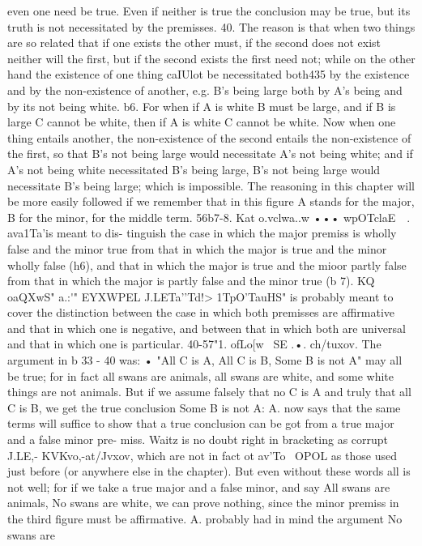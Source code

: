 {even one need be true. Even if neither is true the conclusion may
be true, but its truth is not necessitated by the premisses.
40. The reason is that when two things are so related that if
one exists the other must, if the second does not exist neither will
the first, but if the second exists the first need not; while on the
other hand the existence of one thing caIUlot be necessitated both435
by the existence and by the non-existence of another, e.g. B's
being large both by A's being and by its not being white.
b6. For when if A is white B must be large, and if B is large C
cannot be white, then if A is white C cannot be white. Now when
one thing entails another, the non-existence of the second entails
the non-existence of the first, so that B's not being large would
necessitate A's not being white; and if A's not being white
necessitated B's being large, B's not being large would necessitate
B's being large; which is impossible.
The reasoning in this chapter will be more easily followed if we
remember that in this figure A stands for the major, B for the
minor, for the middle term.
56b7-8. Kat o.vclwa}..w ••• wpOTclaE~~. ava1Ta'\Lv is meant to dis-
tinguish the case in which the major premiss is wholly false and
the minor true from that in which the major is true and the minor
wholly false (h6), and that in which the major is true and the
mioor partly false from that in which the major is partly false and
the minor true (b 7). KQ~ oaQXwS" a.:\'\wS" EYXWPEL J.LETa'\afkiv 'Td!>
1TpO'TauHS" is probably meant to cover the distinction between the
case in which both premisses are affirmative and that in which one
is negative, and between that in which both are universal and that
in which one is particular.
40-57"1. ofLo[w~ SE .•. ch/tuxov. The argument in b 33 - 40 was:
• "All C is A, All C is B, Some B is not A" may all be true; for in
fact all swans are animals, all swans are white, and some white
things are not animals. But if we assume falsely that no C is A and
truly that all C is B, we get the true conclusion Some B is not A:
A. now says that the same terms will suffice to show that a true
conclusion can be got from a true major and a false minor pre-
miss. Waitz is no doubt right in bracketing as corrupt J.LE,\av-
KVKvo,-at/Jvxov, which are not in fact ot av'To~ OPOL as those used just
before (or anywhere else in the chapter). But even without these
words all is not well; for if we take a true major and a false minor,
and say All swans are animals, No swans are white, we can prove
nothing, since the minor premiss in the third figure must be
affirmative. A. probably had in mind the argument No swans are

